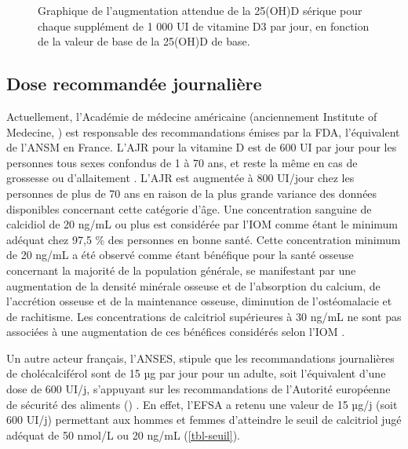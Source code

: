 \documentclass[
  a4paper,
  DIV=11,
  numbers=noendperiod,
  listof=totoc]{scrreprt}
\begin{document}
\begin{figure}
\begin{minipage}[t]{0.50\linewidth}
{{}

\caption{\label{fig-vd-expected-rise}Graphique de l'augmentation
attendue de la 25(OH)D sérique pour chaque supplément de 1 000 UI de
vitamine D3 par jour, en fonction de la valeur de base de la 25(OH)D de
base. \autocite{Garland.2011}}

}

\end{minipage}%

\end{figure}

\hypertarget{dose-recommanduxe9e-journaliuxe8re}{%
\subsection{Dose recommandée
journalière}\label{dose-recommanduxe9e-journaliuxe8re}}

Actuellement, l'Académie de médecine américaine (anciennement Institute
of Medecine, ) est responsable des recommandations émises par
la \ac{FDA}, l'équivalent de l'\ac{ANSM} en France. L'\ac{AJR} pour la
vitamine D est de 600 UI par jour pour les personnes tous sexes
confondus de 1 à 70 ans, et reste la même en cas de grossesse ou
d'allaitement \autocite{IOM.2011}. L'\ac{AJR} est augmentée à 800
UI/jour chez les personnes de plus de 70 ans en raison de la plus grande
variance des données disponibles concernant cette catégorie d'âge. Une
concentration sanguine de calcidiol de 20 ng/mL ou plus est considérée
par l'\ac{IOM} comme étant le minimum adéquat chez 97,5 \% des personnes
en bonne santé. Cette concentration minimum de 20 ng/mL a été observé
comme étant bénéfique pour la santé osseuse concernant la majorité de la
population générale, se manifestant par une augmentation de la densité
minérale osseuse et de l'absorption du calcium, de l'accrétion osseuse
et de la maintenance osseuse, diminution de l'ostéomalacie et de
rachitisme. Les concentrations de calcitriol supérieures à 30 ng/mL ne
sont pas associées à une augmentation de ces bénéfices considérés selon
l'\ac{IOM} \autocite{IOM.2011,Rosen.2012}.

Un autre acteur français, l'\ac{ANSES}, stipule que les recommandations
journalières de cholécalciférol sont de 15 µg par jour pour un adulte,
soit l'équivalent d'une dose de 600 UI/j, s'appuyant sur les
recommandations de l'Autorité européenne de sécurité des aliments
() \autocite{ANSES.2021}. En effet, l'\ac{EFSA} a retenu une
valeur de 15 µg/j (soit 600 UI/j) permettant aux hommes et femmes
d'atteindre le seuil de calcitriol jugé adéquat de 50 nmol/L ou 20 ng/mL
\autocite{ANSES.2022} (\cref{tbl-seuil}).
\end{document}
